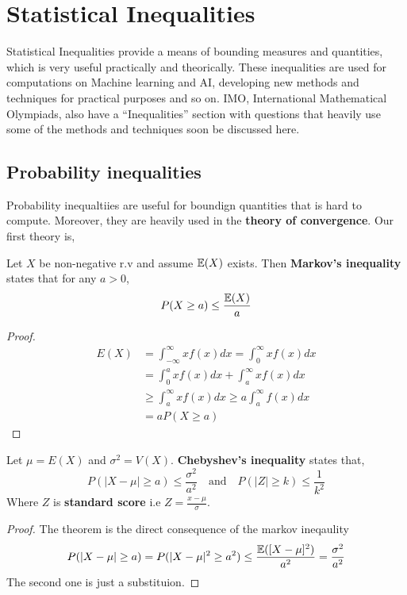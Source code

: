 \chapter{Statistical Inequalities}
Statistical Inequalities provide a means of bounding measures and quantities, which is very useful practically and theorically. These inequalities are used for computations on Machine learning and AI, developing new methods and techniques for practical purposes and so on. IMO, International Mathematical Olympiads, also have a ``Inequalities'' section with questions that heavily use some of the methods and techniques soon be discussed here.
\section{Probability inequalities}
Probability inequaltiies are useful for boundign quantities that is hard to compute. Moreover, they are heavily used in the \textbf{theory of convergence}. Our first theory is,
\begin{theorem}
    Let $X$ be  non-negative r.v and assume ${\mathbb{E}}(X)$ exists. Then \textbf{Markov's inequality} states that for any  $a > 0$,
    \[ P(X \ge a) \le \frac{{\mathbb{E}}(X)}{a}\]

    \begin{proof}
        \begin{align*}
            E(X) &= \int_{-\infty}^{\infty} xf(x)dx  = \int_{0}^{\infty} xf(x)dx \\
                 &=  \int_{0}^a xf(x)dx + \int_{a}^{\infty} xf(x)dx \\
                 & \ge \int_{a}^{\infty} xf(x)dx \ge a \int_{a}^{\infty}f(x)dx \\
                 & = a P(X \ge a)
        \end{align*}
    \end{proof}
\end{theorem}

\begin{theorem}
    Let $\mu = E(X)$ and $\sigma^2 = V(X)$. \textbf{Chebyshev's inequality} states that,
    \[ P(| X - \mu | \ge a) \le  \frac{\sigma^2}{a^2} \quad \text{and} \quad P(|Z| \ge k ) \le \frac{1}{k^2}\]
    Where $Z$ is \textbf{standard score} i.e $Z = \frac{x - \mu}{\sigma}$.
    \begin{proof}
        The theorem is the direct consequence of the markov ineqaulity
        \[ P(|X- \mu| \ge a) = P(|X - \mu|^2 \ge a^2) \le \frac{{\mathbb{E}}([X- \mu]^2)}{a^2} = \frac{\sigma^2}{a^2}\]
        The second one is just a substituion.
    \end{proof}
\end{theorem}
